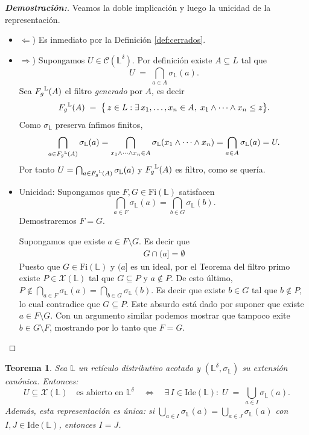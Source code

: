 \documentclass[12pt]{book}
\newtheorem{theorem}{Teorema}[section]
\newcommand{\Fg}{\mathnormal{F_g}}
\begin{document}
\begin{proof}[\textbf{Demostración:}]
Veamos la doble implicación y luego la unicidad de la representación.
\begin{itemize}
    \item $\Leftarrow$) Es inmediato por la Definición \ref{def:cerrados}. 
    \item $\Rightarrow$) Supongamos \(U\in\mathcal{C}(\mathbb{L}^\delta)\). Por definición existe \(A\subseteq L\) tal que
\[
  U \;=\;\bigcap_{a\in A}\sigma_{\mathbb{L}}(a).
\]
Sea \(\Fg^{\mathbb{L}}(A)\) el filtro \emph{generado} por \(A\), es decir
\[
  \Fg^{\mathbb{L}}(A) \;=\;
  \bigl\{\,z\in L : \exists\,x_1,\dots,x_n\in A,\;
                 x_1\wedge\cdots\wedge x_n\le z
  \bigr\}.
\]
Como \(\sigma_{\mathbb{L}}\) preserva ínfimos finitos,
\[
  \bigcap_{a\in \Fg^{\mathbb{L}}(A)}\sigma_{\mathbb{L}}(a)
  =\bigcap_{\substack{x_1\wedge\cdots\wedge x_n\in A}}
    \sigma_{\mathbb{L}}(x_1\wedge\cdots\wedge x_n)
  =\bigcap_{a\in A}\sigma_{\mathbb{L}}(a)
  =U.
\]
Por tanto \(U=\bigcap_{a\in \Fg^{\mathbb{L}}(A)}\sigma_{\mathbb{L}}(a)\) y \(\Fg^{\mathbb{L}}(A)\) es filtro, como se quería.

\item Unicidad: Supongamos que \(F,G\in\mathrm{Fi}(\mathbb L)\) satisfacen
\[
\bigcap_{a\in F}\sigma_{\mathbb{L}}(a)
=\bigcap_{b\in G}\sigma_{\mathbb{L}}(b).
\]
Demostraremos \(F=G\).

Supongamos que existe \(a\in F\setminus G\). Es decir que 
\begin{align*}
    G\cap(a] = \emptyset
\end{align*}
Puesto que $G\in\mathrm{Fi}(\mathbb L)$ y $(a]$ es un ideal, por el Teorema del filtro primo existe $P\in \mathcal{X}(\mathbb L)$ tal que $G\subseteq P$ y $a\notin P$. De esto último, $P\notin \bigcap_{a\in F} \sigma_{\mathbb{L}}(a)=\bigcap_{b\in G}\sigma_{\mathbb{L}}(b)$. Es decir que existe $b\in G$ tal que $b\notin P$, lo cual contradice que $G\subseteq P$. Este absurdo está dado por suponer que existe \(a\in F\setminus G\). Con un argumento similar podemos mostrar que tampoco exite  \(b\in G\setminus F\), mostrando por lo tanto que \(F=G\).
\end{itemize}
\end{proof}

\begin{theorem}\label{thm:abiertos-ideales}
Sea \(\mathbb{L}\) un retículo distributivo acotado y $(\mathbb{L}^{\delta},\sigma_{\mathbb{L}})$ su extensión canónica. Entonces:
\[
U\subseteq\mathcal{X}(\mathbb{L})
\quad
\text{es abierto en }\mathbb{L}^{\delta}
\quad\Longleftrightarrow\quad
\exists\,I\in\mathrm{Ide}(\mathbb{L}):\;
U \;=\;\bigcup_{a\in I}\sigma_{\mathbb{L}}(a).
\]
Además, esta representación es única: si \(\bigcup_{a\in I}\sigma_{\mathbb{L}}(a)
=\bigcup_{a\in J}\sigma_{\mathbb{L}}(a)\) con \(I,J\in\mathrm{Ide}(\mathbb{L})\), 
entonces \(I=J\).
\end{theorem}
\end{document}
